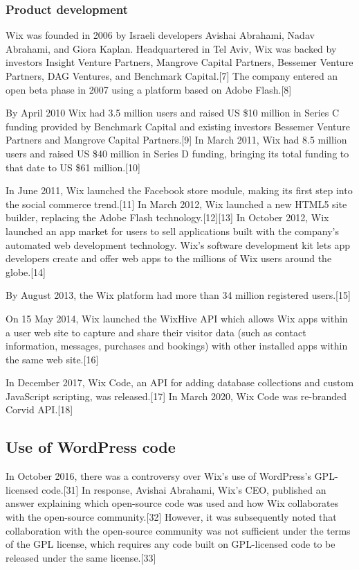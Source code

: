 \documentclass[12pt]{article}
\begin{document}
\subsubsection{Product development}

Wix was founded in 2006 by Israeli developers Avishai Abrahami, Nadav Abrahami, and Giora Kaplan. Headquartered in Tel Aviv, Wix was backed by investors Insight Venture Partners, Mangrove Capital Partners, Bessemer Venture Partners, DAG Ventures, and Benchmark Capital.[7] The company entered an open beta phase in 2007 using a platform based on Adobe Flash.[8]

By April 2010 Wix had 3.5 million users and raised US \$10 million in Series C funding provided by Benchmark Capital and existing investors Bessemer Venture Partners and Mangrove Capital Partners.[9] In March 2011, Wix had 8.5 million users and raised US \$40 million in Series D funding, bringing its total funding to that date to US \$61 million.[10]

In June 2011, Wix launched the Facebook store module, making its first step into the social commerce trend.[11] In March 2012, Wix launched a new HTML5 site builder, replacing the Adobe Flash technology.[12][13] In October 2012, Wix launched an app market for users to sell applications built with the company's automated web development technology. Wix's software development kit lets app developers create and offer web apps to the millions of Wix users around the globe.[14]

By August 2013, the Wix platform had more than 34 million registered users.[15]

On 15 May 2014, Wix launched the WixHive API which allows Wix apps within a user web site to capture and share their visitor data (such as contact information, messages, purchases and bookings) with other installed apps within the same web site.[16]

In December 2017, Wix Code, an API for adding database collections and custom JavaScript scripting, was released.[17] In March 2020, Wix Code was re-branded Corvid API.[18] 



\subsection{Use of WordPress code}

In October 2016, there was a controversy over Wix's use of WordPress's GPL-licensed code.[31] In response, Avishai Abrahami, Wix's CEO, published an answer explaining which open-source code was used and how Wix collaborates with the open-source community.[32] However, it was subsequently noted that collaboration with the open-source community was not sufficient under the terms of the GPL license, which requires any code built on GPL-licensed code to be released under the same license.[33]
\end{document}
